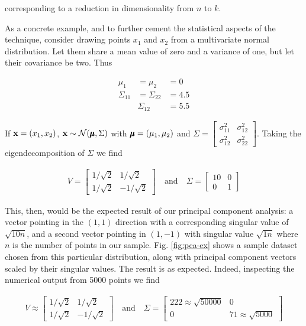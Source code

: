 corresponding to a reduction in dimensionality from $n$ to $k$.

As a concrete example, and to further cement the statistical aspects
of the technique, consider drawing points $x_1$ and $x_2$ from a
multivariate normal distribution. Let them share a mean value of zero
and a variance of one, but let their covariance be two. Thus

\begin{align}
  \mu_1 &= \mu_2 &= 0 \\
  \Sigma_{11} &= \Sigma_{22} &= 4.5 \\
  &\Sigma_{12} &= 5.5
\end{align}

If $\mathbf{x} = (x_1, x_2)$, $\mathbf{x} \sim \mathcal{N}(\pmb{\mu}, \Sigma)$ with
$\pmb{\mu} = (\mu_1, \mu_2)$ and $\Sigma = \begin{bmatrix} \sigma_{11}^2 &
  \sigma_{12}^2 \\ \sigma_{12}^2 &
  \sigma_{22}^2 \end{bmatrix}$. Taking the eigendecomposition of
$\Sigma$ we find

\begin{align}
  V = \begin{bmatrix} 1/\sqrt{2} & 1/\sqrt{2} \\
    1/\sqrt{2} & - 1/\sqrt{2} 
  \end{bmatrix} \quad \mathrm{and} \quad
                 \Sigma = \begin{bmatrix} 10 & 0 \\
                   0 & 1 
                 \end{bmatrix}
\end{align}

This, then, would be the expected result of our principal component
analysis: a vector pointing in the $(1,1)$ direction with a
corresponding singular value of $\sqrt{10 n}$, and a second vector pointing in
$(1, -1)$ with singular value $\sqrt{1 n}$ where $n$ is the number of
points in our sample. Fig. \ref{fig:pca-ex} shows a
sample dataset chosen from this particular distribution, along with
principal component vectors scaled by their singular values. The
result is as expected. Indeed, inspecting the numerical output from
5000 points we find

\begin{align}
  V \approx \begin{bmatrix} 1/\sqrt{2} & 1/\sqrt{2} \\
    1/\sqrt{2} & - 1/\sqrt{2} 
  \end{bmatrix} \quad \mathrm{and} \quad
                 \Sigma = \begin{bmatrix} 222 \approx \sqrt{50000} & 0 \\
                   0 & 71 \approx \sqrt{5000}
                 \end{bmatrix}
\end{align}

